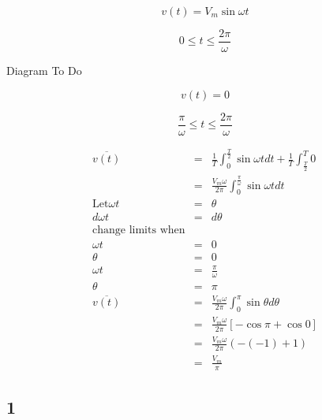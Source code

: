 \documentclass[a4paper,12pt]{article}
\begin{document}
\[ v(t) = V_{m} \sin{\omega t} \]

\[ 0 \leq t \leq \frac{2 \pi}{\omega} \]

\begin{table}[hbtp]

Diagram To Do

\end{table}

\[ v(t) = 0 \]

\[ \frac{\pi}{\omega} \leq t \leq \frac{2 \pi}{\omega} \]

\begin{eqnarray*}
\overline{v(t)} & = & \frac{1}{T} \int^{\frac{T}{2}}_{0} \sin{\omega t}dt 
							 + \frac{1}{T} \int^{T}_{\frac{T}{2}} 0 \\
					 & = & \frac{V_{m} \omega}{2 \pi} \int^{\frac{\pi}{\omega}}_{0} 
					 		 \sin{\omega t}dt \\
\mbox{Let} \omega t & = & \theta \\
d \omega t & = & d \theta \\
\mbox{change limits when} &  & \\
\omega t & = & 0 \\
\theta   & = & 0 \\
\omega t & = & \frac{\pi}{\omega} \\
\theta	& = & \pi \\
\overline{v(t)} & = & \frac{V_{m} \omega}{2 \pi} \int^{\pi}_{0}
\sin{\theta}d \theta \\
					 & = & \frac{V_{m} \omega}{2 \pi} \left[ - \cos{\pi} +
					 \cos{0} \right] \\
					 & = & \frac{V_{m} \omega}{2 \pi} \left(-(-1) + 1 \right) \\
					 & = & \frac{V_{m}}{\pi}
\end{eqnarray*}

\subsection{1}
\end{document}
